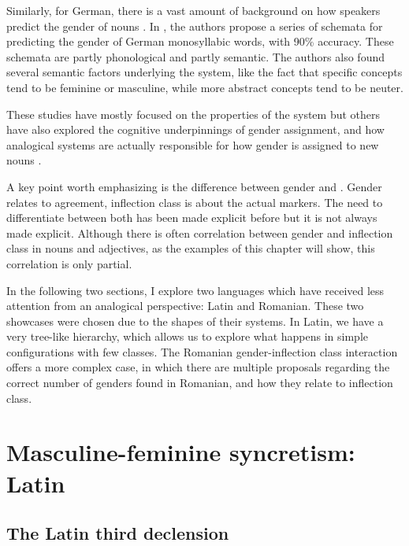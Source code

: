 Similarly, for German, there is a vast amount of background on how speakers predict the gender of nouns  \autocites{Hahn.2000, Kopcke.1984, Kopcke.2010, Salmons.1993, Schwichtenberg.2004, Zubin.1986, Zubin.1984}. In \textcite{Kopcke.1984}, the authors propose a series of schemata for predicting the gender of German monosyllabic words, with 90\% accuracy. These schemata are partly phonological and partly semantic. The authors also found several semantic factors underlying the system, like the fact that specific concepts tend to be feminine or masculine, while more abstract concepts tend to be neuter.

These studies have mostly focused on the properties of the system but others have also explored the cognitive underpinnings of gender assignment, and how analogical systems are actually responsible for how gender is assigned to new nouns \autocites{Holmes.2004, Caffarra.2015, Caffarra.2015a, Taylor.2012}.

A key point worth emphasizing is the difference between gender and . Gender relates to agreement, inflection class is about the actual markers. The need to differentiate between both has been made explicit before \autocite{Aronoff.1994, Harris.1991} but it is not always made explicit. Although there is often correlation between gender and inflection class in nouns and adjectives, as the examples of this chapter will show, this correlation is only partial.

In the following two sections, I explore two languages which have received less attention from an analogical perspective: Latin and Romanian. These two showcases were chosen due to the shapes of their systems. In Latin, we have a very tree-like hierarchy, which allows us to explore what happens in simple configurations with few classes. The Romanian gender-inflection class interaction offers a more complex case, in which there are multiple proposals regarding the correct number of genders found in Romanian, and how they relate to inflection class.

\newpage
\section{Masculine-feminine syncretism: Latin}

\subsection{The Latin third declension}

